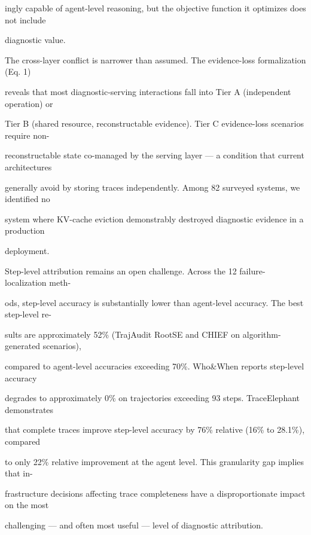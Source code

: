 \begin{flushleft}
\noindent ingly capable of agent-level reasoning, but the objective function it optimizes does not include\par
\noindent diagnostic value.\par
\par\smallskip
\noindent The cross-layer conflict is narrower than assumed. The evidence-loss formalization (Eq. 1)\par
\noindent reveals that most diagnostic-serving interactions fall into Tier A (independent operation) or\par
\noindent Tier B (shared resource, reconstructable evidence). Tier C evidence-loss scenarios require non-\par
\noindent reconstructable state co-managed by the serving layer — a condition that current architectures\par
\noindent generally avoid by storing traces independently. Among 82 surveyed systems, we identified no\par
\noindent system where KV-cache eviction demonstrably destroyed diagnostic evidence in a production\par
\noindent deployment.\par
\par\smallskip
\noindent Step-level attribution remains an open challenge. Across the 12 failure-localization meth-\par
\noindent ods, step-level accuracy is substantially lower than agent-level accuracy. The best step-level re-\par
\noindent sults are approximately 52\% (TrajAudit RootSE and CHIEF on algorithm-generated scenarios),\par
\noindent compared to agent-level accuracies exceeding 70\%. Who\&When reports step-level accuracy\par
\noindent degrades to approximately 0\% on trajectories exceeding 93 steps. TraceElephant demonstrates\par
\noindent that complete traces improve step-level accuracy by 76\% relative (16\% to 28.1\%), compared\par
\noindent to only 22\% relative improvement at the agent level. This granularity gap implies that in-\par
\noindent frastructure decisions affecting trace completeness have a disproportionate impact on the most\par
\noindent challenging — and often most useful — level of diagnostic attribution.\par
\par\smallskip

\end{flushleft}
